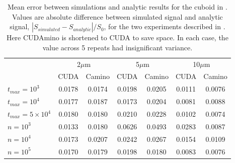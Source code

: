\begin{table}
  \centering
  \begin{tabular}{lcccccc}
    \hline
    & \multicolumn{2}{c}{2$\mu$m} & \multicolumn{2}{c}{5$\mu$m} & \multicolumn{2}{c}{10$\mu$m}\\
    & CUDA & Camino & CUDA & Camino & CUDA & Camino \\\hline
    $t_{max}=10^3$ & 0.0178 & 0.0174 & 0.0198 & 0.0205 & 0.0111 & 0.0076\\
    $t_{max}=10^4$ & 0.0177 & 0.0187 & 0.0173 & 0.0204 & 0.0081 & 0.0088\\
    $t_{max}=5\times10^4$ & 0.0180 & 0.0180 & 0.0210 & 0.0228 & 0.0102 & 0.0074\\\rule{0pt}{3ex}
    $n=10^3$ & 0.0133 & 0.0180 & 0.0626 & 0.0493 & 0.0283 & 0.0087 \\
    $n=10^4$ & 0.0173 & 0.0207 & 0.0242 & 0.0267 & 0.0154 & 0.0109 \\
    $n=10^5$ & 0.0170 & 0.0179 & 0.0198 & 0.0180 & 0.0083 & 0.0076 \\

    \hline
  \end{tabular}
  \caption[Mean error between simulations and analytic results for the cuboid in .]{Mean error between simulations and analytic results for the cuboid in . Values are absolute difference between simulated signal and analytic signal, $|S_{simulated} - S_{analytic}|/S_0$, for the two experiments described in . Here CUDAmino is shortened to CUDA to save space. In each case, the value across 5 repeats had insignificant variance.}
  \label{tab:cuboid_results}
\end{table}


